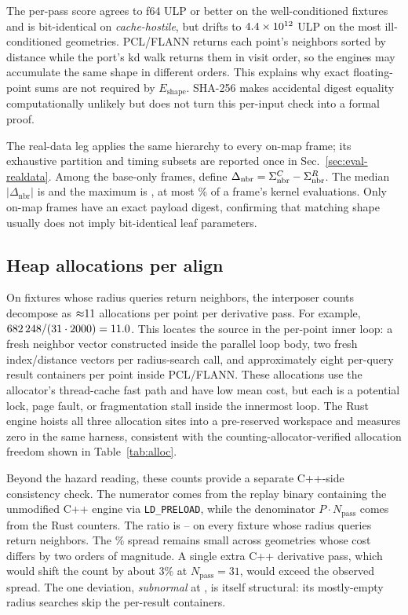 The per-pass score agrees to \traceUlpConvMax{} f64 ULP or better on the
well-conditioned fixtures and is bit-identical on \emph{cache-hostile}, but drifts to
$4.4\times 10^{12}$ ULP on the most ill-conditioned geometries. PCL/FLANN returns each
point's neighbors sorted by distance while the port's kd walk returns them in visit order,
so the engines may accumulate the same shape in different orders. This explains why exact
floating-point sums are not required by $E_{\mathrm{shape}}$. SHA-256 makes accidental
digest equality computationally unlikely but does not turn this per-input check into a
formal proof.

The real-data leg applies the same hierarchy to every on-map frame; its exhaustive
partition and timing subsets are reported once in Sec.~\ref{sec:eval-realdata}. Among the
\traceRealWorkGapFrames{} base-only frames, define
$\Delta_{\mathrm{nbr}}=\Sigma_{\mathrm{nbr}}^C-\Sigma_{\mathrm{nbr}}^R$. The median $|\Delta_{\mathrm{nbr}}|$ is
\traceRealWorkGapNbrMed{} and the maximum is \traceRealWorkGapNbrMax, at most
\traceRealWorkGapRelMaxPct\% of a frame's kernel evaluations. Only
\tracePayloadExactOnMap{} on-map frames have an exact payload digest, confirming that
matching shape usually does not imply bit-identical leaf parameters.

\subsection{Heap allocations per align}
\label{sec:eval-alloc}
On fixtures whose radius queries return neighbors, the interposer counts decompose as
${\approx}11$ allocations per point per derivative pass. For example,
$\num{682248}{} / (31 \cdot 2000) = 11.0$. This locates the
source in the per-point inner loop: a fresh neighbor
vector constructed inside the parallel loop body, two fresh index/distance vectors per
radius-search call, and approximately eight per-query result containers per point inside PCL/FLANN.
These allocations use the allocator's thread-cache fast path and have low mean cost, but
each is a
potential lock, page fault, or fragmentation stall inside the innermost loop. The Rust
engine hoists all three allocation sites into a pre-reserved workspace and measures zero in
the same harness, consistent with the counting-allocator-verified allocation freedom shown
in Table~\ref{tab:alloc}.

Beyond the hazard reading, these counts provide a separate C++-side consistency check.
The numerator comes from the replay binary containing the unmodified C++ engine via
\texttt{LD\_PRELOAD}, while the denominator
$P \cdot N_{\mathrm{pass}}$ comes from the Rust counters. The ratio is
\allocCertMin--\allocCertMax{} on every fixture whose radius queries return neighbors.
The \allocCertSpreadPct\% spread remains small across geometries whose cost differs by two
orders of magnitude. A single extra C++ derivative pass, which would shift the count by
about 3\% at $N_{\mathrm{pass}} = 31$, would exceed the observed spread. The
one deviation, \emph{subnormal} at \allocCertSparse{}, is itself structural: its
mostly-empty radius searches skip the per-result containers.

